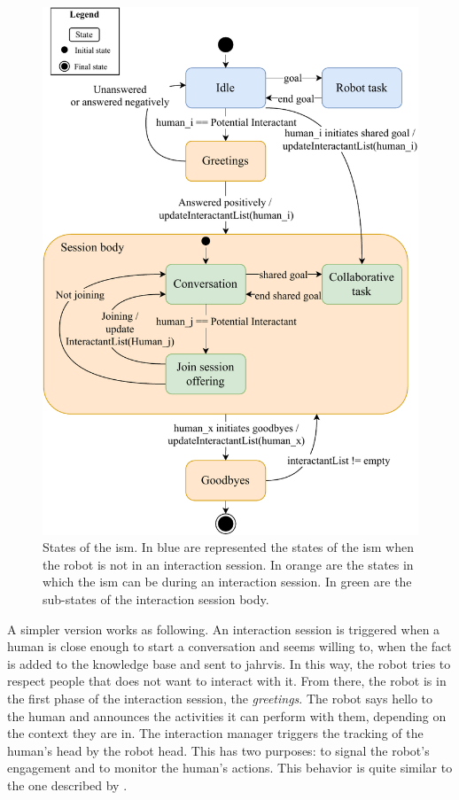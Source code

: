 \documentclass[a4paper,11pt,twoside]{StyleThese}
\begin{document}
\begin{figure}[!htb]
	\centering
	\includegraphics[width=0.8\linewidth]{figures/chapter2/session_manager.pdf}
	\caption{States of the \acrfull{ism}. In blue are represented the states of the \acrshort{ism} when the robot is not in an interaction session. In orange are the states in which the \acrshort{ism} can be during an interaction session. In green are the sub-states of the interaction session body.}
	\label{chap6:fig:session_manager}
\end{figure}

A simpler version works as following. An interaction session is triggered when a human is close enough to start a conversation and seems willing to, \ie when the fact   is added to the knowledge base and sent to \acrshort{jahrvis}. In this way, the robot tries to respect people that does not want to interact with it. From there, the robot is in the first phase of the interaction session, the \textit{greetings}. The robot says hello to the human and announces the activities it can perform with them, depending on the context they are in. The interaction manager triggers the tracking of the human's head by the robot head. This has two purposes: to signal the robot's engagement and to monitor the human's actions. This behavior is quite similar to the one described by \cite{satake_2015_should}. 
\end{document}
